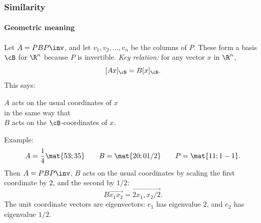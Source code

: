 
\begin{frame}
\frametitle{Similarity}
\framesubtitle{Geometric meaning}

Let $A = PBP\inv$, and let $v_1,v_2,\ldots,v_n$ be the columns of $P$.
\pause
These form a basis $\cB$ for $\R^n$ because $P$ is invertible.
\pause
\emph{Key relation:} for any vector $x$ in $\R^n$,
\[ [Ax]_\cB = B[x]_\cB. \]
\pause
This says:
\begin{center}
  $A$ acts on the usual coordinates of $x$\\
  in the same way that\\
  $B$ acts on the $\cB$-coordinates of $x$.
\end{center}

\pause\smallskip
\alert{Example:}
\vskip-2mm
\[ A = \frac 14\mat{5 3; 3 5} \qquad
B = \mat{2 0; 0 1/2} \qquad
P = \mat{1 1; 1 -1}. \]
\pause
Then $A=PBP\inv$.
\pause
$B$ acts on the usual coordinates by
\pause
scaling the first coordinate by $2$, and the second by $1/2$:
\displayskips{3pt}
\[ B\vec{x_1 x_2} = \vec{2x_1, x_2/2}. \]
\pause
The unit coordinate vectors are eigenvectors: $e_1$ has eigenvalue
\pause
$2$, and $e_2$ has eigenvalue
\pause
$1/2$.

\end{frame}



